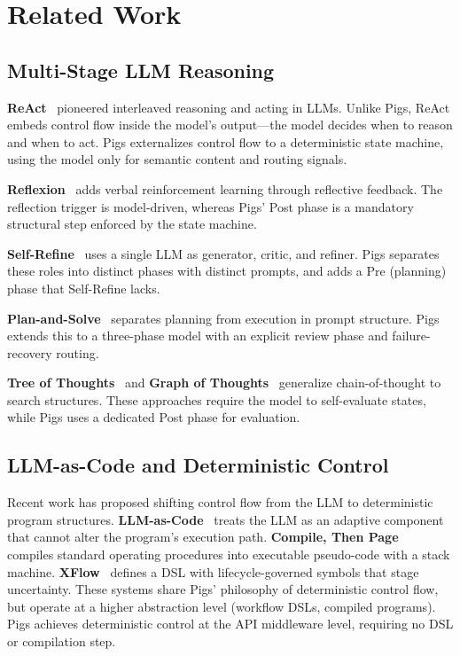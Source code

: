 \section{Related Work}
\label{sec:related}

\subsection{Multi-Stage LLM Reasoning}

\textbf{ReAct}~\citep{yao2022react} pioneered interleaved reasoning and acting in LLMs. Unlike Pigs, ReAct embeds control flow inside the model's output---the model decides when to reason and when to act. Pigs externalizes control flow to a deterministic state machine, using the model only for semantic content and routing signals.

\textbf{Reflexion}~\citep{shinn2023reflexion} adds verbal reinforcement learning through reflective feedback. The reflection trigger is model-driven, whereas Pigs' Post phase is a mandatory structural step enforced by the state machine.

\textbf{Self-Refine}~\citep{madaan2023selfrefine} uses a single LLM as generator, critic, and refiner. Pigs separates these roles into distinct phases with distinct prompts, and adds a Pre (planning) phase that Self-Refine lacks.

\textbf{Plan-and-Solve}~\citep{wang2023plan} separates planning from execution in prompt structure. Pigs extends this to a three-phase model with an explicit review phase and failure-recovery routing.

\textbf{Tree of Thoughts}~\citep{yao2023tot} and \textbf{Graph of Thoughts}~\citep{besta2023got} generalize chain-of-thought to search structures. These approaches require the model to self-evaluate states, while Pigs uses a dedicated Post phase for evaluation.

\subsection{LLM-as-Code and Deterministic Control}

Recent work has proposed shifting control flow from the LLM to deterministic program structures. \textbf{LLM-as-Code}~\citep{llmascode2026} treats the LLM as an adaptive component that cannot alter the program's execution path. \textbf{Compile, Then Page}~\citep{compilepage2026} compiles standard operating procedures into executable pseudo-code with a stack machine. \textbf{XFlow}~\citep{xflow2026} defines a DSL with lifecycle-governed symbols that stage uncertainty. These systems share Pigs' philosophy of deterministic control flow, but operate at a higher abstraction level (workflow DSLs, compiled programs). Pigs achieves deterministic control at the API middleware level, requiring no DSL or compilation step.

